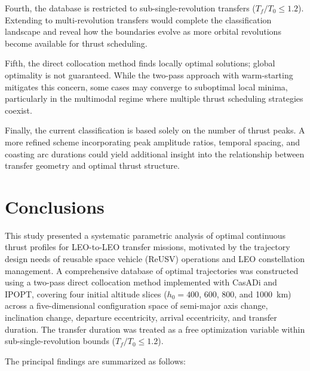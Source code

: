 \documentclass[a4paper,fleqn]{cas-dc}
\begin{document}
Fourth, the database is restricted to sub-single-revolution transfers ($T_f/T_0 \leq 1.2$). Extending to multi-revolution transfers would complete the classification landscape and reveal how the boundaries evolve as more orbital revolutions become available for thrust scheduling.

Fifth, the direct collocation method finds locally optimal solutions; global optimality is not guaranteed. While the two-pass approach with warm-starting mitigates this concern, some cases may converge to suboptimal local minima, particularly in the multimodal regime where multiple thrust scheduling strategies coexist.

Finally, the current classification is based solely on the number of thrust peaks. A more refined scheme incorporating peak amplitude ratios, temporal spacing, and coasting arc durations could yield additional insight into the relationship between transfer geometry and optimal thrust structure.


\section{Conclusions}\label{sec:conclusions}

This study presented a systematic parametric analysis of optimal continuous thrust profiles for LEO-to-LEO transfer missions, motivated by the trajectory design needs of reusable space vehicle (ReUSV) operations and LEO constellation management. A comprehensive database of optimal trajectories was constructed using a two-pass direct collocation method implemented with CasADi and IPOPT, covering four initial altitude slices ($h_0 = 400$, 600, 800, and 1000~km) across a five-dimensional configuration space of semi-major axis change, inclination change, departure eccentricity, arrival eccentricity, and transfer duration. The transfer duration was treated as a free optimization variable within sub-single-revolution bounds ($T_f/T_0 \leq 1.2$).

The principal findings are summarized as follows:
\end{document}
